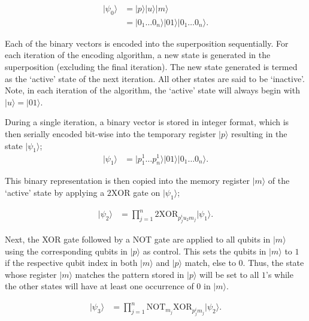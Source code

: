 \begin{align}
    \vert \psi_0 \rangle &= \vert p \rangle \vert u \rangle \vert m \rangle \\
     &= \vert 0_1 \dots  0_n \rangle \vert 0 1 \rangle \vert 0_1\dots  0_n \rangle .
\end{align}

Each of the binary vectors is encoded into the superposition sequentially. For each iteration of the encoding algorithm, a new state is generated in the superposition (excluding the final iteration). The new state generated is termed as the `active' state of the next iteration. All other states are said to be `inactive'. Note, in each iteration of the algorithm, the `active' state will always begin with $\vert u \rangle = \vert 01\rangle$. 

During a single iteration, a binary vector is stored in integer format, which is then serially encoded bit-wise into the temporary register $\vert p \rangle$ resulting in the state $\vert \psi_1 \rangle$;
\begin{align}
    \vert \psi_1 \rangle & =  \vert p_1^1\dots p_n^1\rangle\vert 01\rangle\vert0_1\dots0_n \rangle.
\end{align}

This binary representation is then copied into the memory register $\vert m \rangle$ of the `active' state by applying a $2\textrm{XOR}$ gate on $\vert \psi_1 \rangle$;

\begin{align}
\label{eq:encode_psi2}
    \vert \psi_2 \rangle & =  \prod\limits_{j=1}^{n} \textrm{2XOR}_{p_j^i u_2 m_j} \vert \psi_1 \rangle.
\end{align}

Next, the \textrm{XOR} gate followed by a \textrm{NOT} gate are applied to all qubits in $\vert m \rangle$ using the corresponding qubits in $\vert p \rangle$ as control. This sets the qubits in $\vert m\rangle$ to $1$ if the respective qubit index in both $\vert m \rangle$ and $\vert p \rangle$ match, else to $0$. Thus, the state whose register $\vert m \rangle$ matches the pattern stored in $\vert p \rangle$ will be set to all $1$'s while the other states will have at least one occurrence of $0$ in $\vert m \rangle$.

\begin{align}
\label{eq:encode_psi3}
  \vert \psi_3 \rangle & =  \prod\limits_{j=1}^{n} \textrm{NOT}_{m_j} \textrm{XOR}_{p_j^i m_j}  \vert \psi_2 \rangle  .
\end{align}

